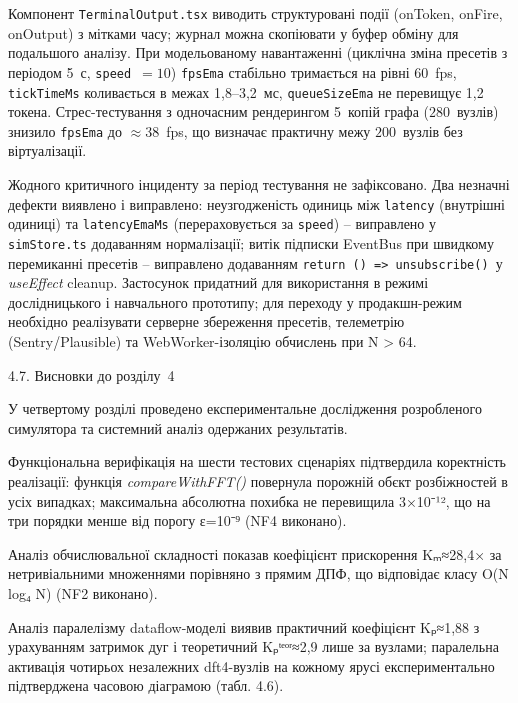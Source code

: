 \documentclass[
]{article}
\begin{document}
Компонент \texttt{TerminalOutput.tsx} виводить структуровані події
(onToken, onFire, onOutput) з мітками часу; журнал можна скопіювати у
буфер обміну для подальшого аналізу. При модельованому навантаженні
(циклічна зміна пресетів з періодом 5~с, \texttt{speed}~\(= 10\))
\texttt{fpsEma} стабільно тримається на рівні 60~fps,
\texttt{tickTimeMs} коливається в межах 1,8--3,2~мс,
\texttt{queueSizeEma} не перевищує 1,2 токена. Стрес-тестування з
одночасним рендерингом 5~копій графа (\(280\)~вузлів) знизило
\texttt{fpsEma} до \(\approx 38\)~fps, що визначає практичну межу
\(200\)~вузлів без віртуалізації.

Жодного критичного інциденту за період тестування не зафіксовано. Два
незначні дефекти виявлено і виправлено: неузгодженість одиниць між
\texttt{latency} (внутрішні одиниці) та \texttt{latencyEmaMs}
(перераховується за \texttt{speed}) -- виправлено у \texttt{simStore.ts}
додаванням нормалізації; витік підписки EventBus при швидкому
перемиканні пресетів -- виправлено додаванням
\texttt{return}\texttt{\ ()\ =\textgreater{}\ }\texttt{unsubscribe}\texttt{()}\texttt{\ }у
\emph{useEffect} cleanup. Застосунок придатний для використання в режимі
дослідницького і навчального прототипу; для переходу у продакшн-режим
необхідно реалізувати серверне збереження пресетів, телеметрію\\
(Sentry/Plausible) та WebWorker-ізоляцію обчислень при N \textgreater{}
64.

\protect{}\label{ux432ux438ux441ux43dux43eux432ux43aux438-ux434ux43e-ux440ux43eux437ux434ux456ux43bux443-4}{}4.7.
Висновки до розділу~4

У четвертому розділі проведено експериментальне дослідження розробленого
симулятора та системний аналіз одержаних результатів.

Функціональна верифікація на шести тестових сценаріях підтвердила
коректність реалізації: функція \emph{compareWithFFT()} повернула
порожній об\textquotesingle єкт розбіжностей в усіх випадках;
максимальна абсолютна похибка не перевищила 3×10⁻¹², що на три порядки
менше від порогу ε=10⁻⁹ (NF4 виконано).

Аналіз обчислювальної складності показав коефіцієнт прискорення Kₘ≈28,4×
за нетривіальними множеннями порівняно з прямим ДПФ, що відповідає класу
O(N log₄ N) (NF2 виконано).

Аналіз паралелізму dataflow-моделі виявив практичний коефіцієнт Kₚ≈1,88
з урахуванням затримок дуг і теоретичний Kₚᵗᵉᵒʳ≈2,9 лише за вузлами;
паралельна активація чотирьох незалежних dft4-вузлів на кожному ярусі
експериментально підтверджена часовою діаграмою (табл. 4.6).
\end{document}
